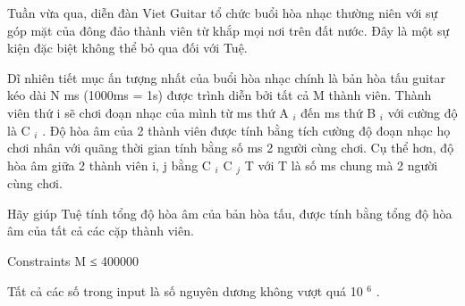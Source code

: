 Tuần vừa qua, diễn đàn Viet Guitar tổ chức buổi hòa nhạc thường niên với sự góp mặt của đông đảo thành viên từ khắp mọi nơi trên đất nước. Đây là một sự kiện đặc biệt không thể bỏ qua đối với Tuệ.  

   Dĩ nhiên tiết mục ấn tượng nhất của buổi hòa nhạc chính là bản hòa tấu guitar kéo dài N ms (1000ms = 1s) được trình diễn bởi tất cả M thành viên. Thành viên thứ i sẽ chơi đoạn nhạc của mình từ ms thứ A   $_    i   $   đến ms thứ B   $_    i   $   với cường độ là C   $_    i   $   . Độ hòa âm của 2 thành viên được tính bằng tích cường độ đoạn nhạc họ chơi nhân với quãng thời gian tính bằng số ms 2 người cùng chơi. Cụ thể hơn, độ hòa âm giữa 2 thành viên i, j bằng C   $_    i   $   C   $_    j   $   T với T là số ms chung mà 2 người cùng chơi.  

   Hãy giúp Tuệ tính tổng độ hòa âm của bản hòa tấu, được tính bằng tổng độ hòa âm của tất cả các cặp thành viên.  

Constraints
M ≤ 400000  

   Tất cả các số trong input là số nguyên dương không vượt quá 10   $^    6   $   .